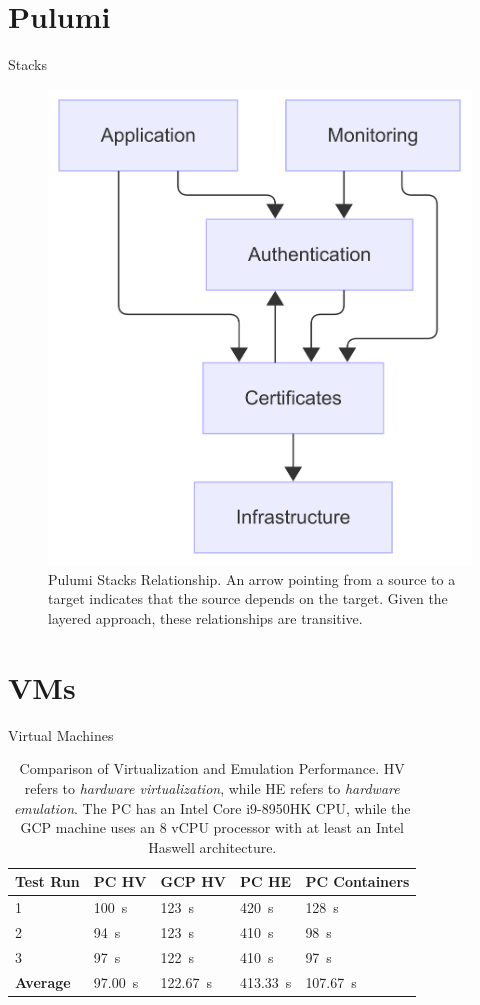 \documentclass{beamer}
\begin{document}
\section{Pulumi}
\begin{frame}{Stacks}
    \begin{figure}
        \centering
        \includegraphics[width=.45\textwidth]{./images/pulumi-stacks.png}
        \caption{Pulumi Stacks Relationship. An arrow pointing from a source to a target indicates that the source depends on the target. Given the layered approach, these relationships are transitive.}
    \end{figure}
\end{frame}

\section{VMs}
\begin{frame}{Virtual Machines}
\begin{table}[h]
\centering
\begin{tabular}{|l|l|l|l|l|}
\hline
\textbf{Test Run} & \textbf{PC HV} & \textbf{GCP HV} & \textbf{PC HE} & \textbf{PC Containers} \\ \hline
1 & \SI{100}{\second} & \SI{123}{\second} & \SI{420}{\second} & \SI{128}{\second} \\ \hline
2 & \SI{94}{\second}  & \SI{123}{\second} & \SI{410}{\second} & \SI{98}{\second}  \\ \hline
3 & \SI{97}{\second}  & \SI{122}{\second} & \SI{410}{\second} & \SI{97}{\second}  \\ \hline \hline
\textbf{Average} & \SI{97.00}{\second} & \SI{122.67}{\second} & \SI{413.33}{\second} & \SI{107.67}{\second} \\ \hline
\end{tabular}
\caption{Comparison of Virtualization and Emulation Performance. HV refers to \textit{hardware virtualization}, while HE refers to \textit{hardware emulation}. The PC has an Intel Core i9-8950HK CPU, while the GCP machine uses an 8 vCPU processor with at least an Intel Haswell architecture.}
\label{table:performance}
\end{table}
\end{frame}
\end{document}
